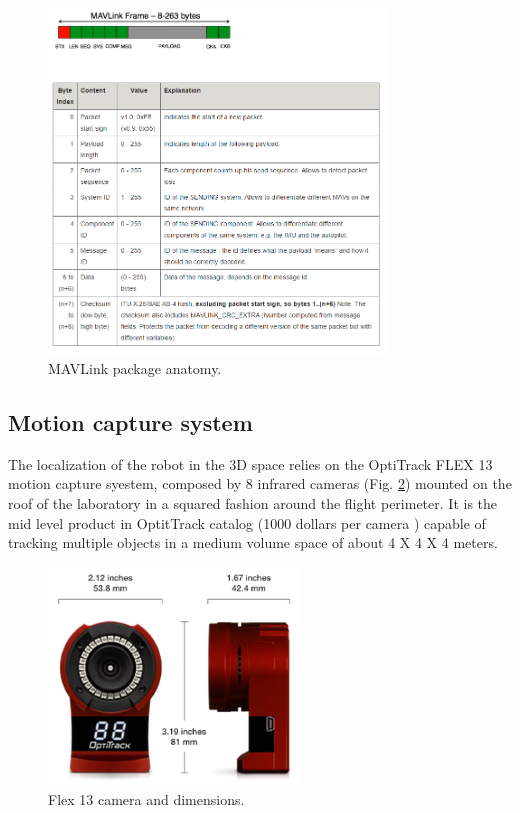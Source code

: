 \begin{figure}[h]
 \centering
 \includegraphics[width=0.8\textwidth]{MAVPack.PNG}
 \caption[MAVLink package anatomy]{MAVLink package anatomy.}
 \label{figure:MAV_anatomy}
\end{figure}

\newpage
\subsection{Motion capture system}
\label{sec:mocap}
The localization of the robot in the 3D space relies on the OptiTrack FLEX 13 motion capture syestem, composed by 8 infrared cameras (Fig. \ref{figure:flex13}) mounted on the roof of the laboratory in a squared fashion around the flight perimeter. It is the mid level product in OptitTrack catalog (1000 dollars per camera \cite{OptiT}) capable of tracking multiple objects in a medium volume space of about 4 X 4 X 4 meters.

\begin{figure}[h]
 \centering
 \includegraphics[width=0.6\textwidth]{flex13.PNG}
 \caption[Flex 13 Cameras]{Flex 13 camera and dimensions.}
 \label{figure:flex13}
\end{figure}


